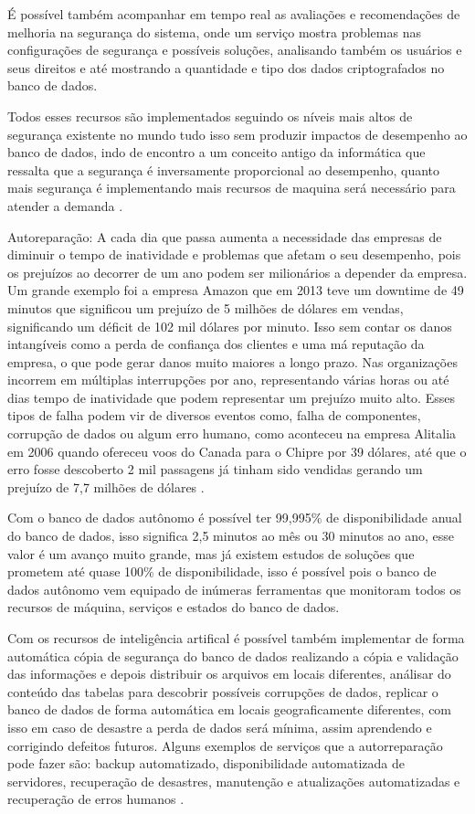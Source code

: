 \begin{alineas}
	É possível também acompanhar em tempo real as avaliações e recomendações de melhoria na segurança do sistema, onde um serviço mostra problemas nas configurações de segurança e possíveis soluções, analisando também os usuários e seus direitos e até mostrando a quantidade e tipo dos dados criptografados no banco de dados.
	
	Todos esses recursos são implementados seguindo os níveis mais altos de segurança existente no mundo tudo isso sem produzir impactos de desempenho ao banco de dados, indo de encontro a um conceito antigo da informática que ressalta que a segurança é inversamente proporcional ao desempenho, quanto mais segurança é implementando mais recursos de maquina será necessário para atender a demanda \cite{OracleDefesa}.
	
	
\item Autoreparação: A cada dia que passa aumenta a necessidade das empresas de diminuir o tempo de inatividade e problemas que afetam o seu desempenho, pois os prejuízos ao decorrer de um ano podem ser milionários a depender da empresa. Um grande exemplo foi a empresa Amazon que em 2013 teve um downtime de 49 minutos que significou um prejuízo de 5 milhões de dólares em vendas, significando um déficit de 102 mil dólares por minuto. Isso sem contar os danos intangíveis como a perda de confiança dos clientes e uma má reputação da empresa, o que pode gerar danos muito maiores a longo prazo. Nas organizações incorrem em múltiplas interrupções por ano, representando várias horas ou até dias tempo de inatividade que podem representar um prejuízo muito alto. Esses tipos de falha podem vir de diversos eventos como, falha de componentes, corrupção de dados ou algum erro humano, como aconteceu na empresa Alitalia em 2006 quando ofereceu voos do Canada para o Chipre por 39 dólares, até que o erro fosse descoberto 2 mil passagens já tinham sido vendidas gerando um prejuízo de 7,7 milhões de dólares \cite{Trapalhada}.

	Com o banco de dados autônomo é possível ter 99,995\% de disponibilidade anual do banco de dados, isso significa 2,5 minutos ao mês ou 30 minutos ao ano, esse valor é um avanço muito grande, mas já existem estudos de soluções que prometem até quase 100\% de disponibilidade, isso é possível pois o banco de dados autônomo vem equipado de inúmeras ferramentas que monitoram todos os recursos de máquina, serviços e estados do banco de dados.	
	
	Com os recursos de inteligência artifical é possível também implementar de forma automática cópia de segurança do banco de dados realizando a cópia e validação das informações e depois distribuir os arquivos em locais diferentes, análisar do conteúdo das tabelas para descobrir possíveis corrupções de dados, replicar o banco de dados de forma automática em locais geograficamente diferentes, com isso em caso de desastre a perda de dados será mínima, assim aprendendo e corrigindo defeitos futuros. Alguns exemplos de serviços que a autorreparação pode fazer são: backup automatizado, disponibilidade automatizada de servidores, recuperação de desastres, manutenção e atualizações automatizadas e recuperação de erros humanos \cite{OracleAut}.
	

\end{alineas}

